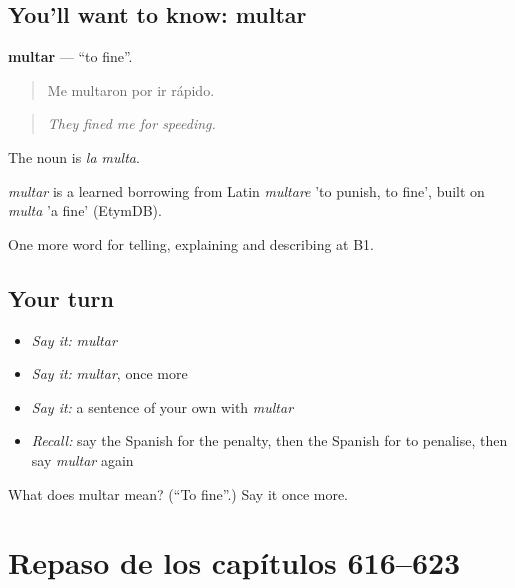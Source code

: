 \subsection*{You'll want to know: multar}
\textbf{multar} — \textquotedblleft{}to fine\textquotedblright{}.

\begin{quote}
Me multaron por ir rápido.
\end{quote}

\begin{quote}
\emph{They fined me for speeding.}
\end{quote}

The noun is \emph{la multa}.

\begin{cousinweb}
\emph{multar} is a learned borrowing from Latin \emph{multare} 'to punish, to fine', built on \emph{multa} 'a fine' (EtymDB).
\end{cousinweb}

\begin{grammarlens}[title={What you've built}]
One more word for telling, explaining and describing at B1.
\end{grammarlens}

\subsection*{Your turn}
\begin{itemize}
\raggedright
  \item \emph{Say it:} \emph{multar}
  \item \emph{Say it:} \emph{multar}, once more
  \item \emph{Say it:} a sentence of your own with \emph{multar}
  \item \emph{Recall:} say the Spanish for the penalty, then the Spanish for to penalise, then say \emph{multar} again
\end{itemize}

\begin{tcolorbox}[breakable,colback=teal!4,colframe=teal!35!black,title={Before you move on}]
What does multar mean? (\textquotedblleft{}To fine\textquotedblright{}.) Say it once more.
\end{tcolorbox}
\section[(dialogue)]{Repaso de los capítulos 616–623}

\label{lesson:ES-R623-repaso-616-623}



